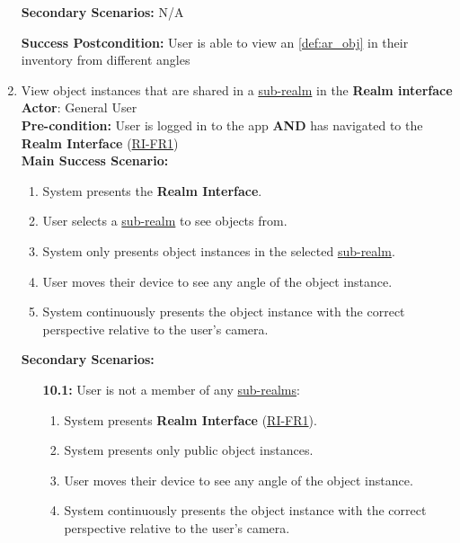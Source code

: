 \documentclass{article}
\begin{document}
\begin{enumerate}[label=\textbf{UC\arabic*}]
          \textbf{Secondary Scenarios:}
          N/A

          \textbf{Success Postcondition:} User is able to view an \ref{def:ar_obj} in their inventory from different angles


    \item \label{uc:10} View object instances that are shared in a \hyperref[def:sub_realm]{sub-realm} in the \textbf{Realm interface} \\
          \textbf{Actor}: General User \\
          \textbf{Pre-condition:} User is logged in to the app \textbf{AND} has navigated to the \textbf{Realm Interface} (\hyperref[ssub:realm_interface]{RI-FR1}) \\

          \textbf{Main Success Scenario:}
          \begin{enumerate}[label=\textbf{\arabic*.}]
              \item System presents the \textbf{Realm Interface}.
              \item User selects a \hyperref[def:sub_realm]{sub-realm} to see objects from.
              \item System only presents object instances in the selected \hyperref[def:sub_realm]{sub-realm}.
              \item User moves their device to see any angle of the object instance.
              \item System continuously presents the object instance with the correct perspective relative to the user’s camera.
          \end{enumerate}

          \textbf{Secondary Scenarios:}
          \begin{itemize}
              \item[{\bf 10.1:}] User is not a member of any \hyperref[def:sub_realm]{sub-realms}:
                    \begin{enumerate}[label=\textbf{\arabic*.}]
                        \item System presents \textbf{Realm Interface} (\hyperref[ssub:realm_interface]{RI-FR1}).
                        \item System presents only public object instances.
                        \item User moves their device to see any angle of the object instance.
                        \item System continuously presents the object instance with the correct perspective relative to the user’s camera.
                    \end{enumerate}
          \end{itemize}


\end{enumerate}
\end{document}
